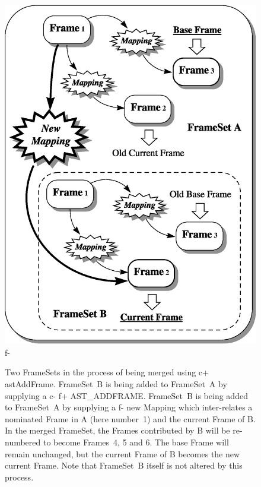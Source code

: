 \documentclass[twoside,11pt]{article}
\newenvironment{latexonly}{}{}
\begin{document}
\begin{latexonly}
\begin{figure}[hbtp]
\begin{center}
   \includegraphics[scale=0.6]{sun210_figures/fsmerge.eps}
f-
   \caption{Two FrameSets in the process of being merged using
c+
   astAddFrame. FrameSet~B is being added to FrameSet~A by supplying a
c-
f+
   AST\_ADDFRAME. FrameSet~B is being added to FrameSet~A by supplying a
f-
   new Mapping which inter-relates a nominated Frame in A (here number~1)
   and the current Frame of B. In the merged FrameSet, the Frames
   contributed by B will be re-numbered to become Frames~4, 5 and 6. The
   base Frame will remain unchanged, but the current Frame of B becomes
   the new current Frame. Note that FrameSet~B itself is not
   altered by this process.}
   \label{fig:fsmerge}
   \end{center}
   \end{figure}
\end{latexonly}
\end{document}
